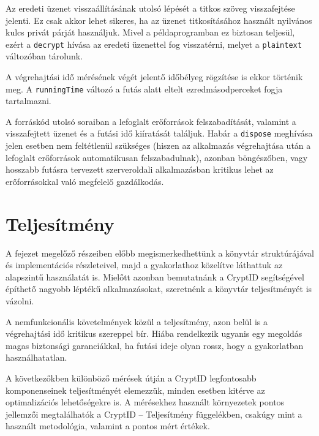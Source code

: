 Az eredeti üzenet visszaállításának utolsó lépését a titkos szöveg visszafejtése jelenti. Ez csak akkor lehet sikeres, ha az üzenet titkosításához használt nyilvános kulcs privát párját használjuk. Mivel a példaprogramban ez biztosan teljesül, ezért a \texttt{decrypt} hívása az eredeti üzenettel fog visszatérni, melyet a \texttt{plaintext} változóban tárolunk.

A végrehajtási idő mérésének végét jelentő időbélyeg rögzítése is ekkor történik meg. A \texttt{runningTime} változó a futás alatt eltelt ezredmásodperceket fogja tartalmazni.



A forráskód utolsó soraiban a lefoglalt erőforrások felszabadítását, valamint a visszafejtett üzenet és a futási idő kiíratását találjuk. Habár a \texttt{dispose} meghívása jelen esetben nem feltétlenül szükséges (hiszen az alkalmazás végrehajtása után a lefoglalt erőforrások automatikusan felszabadulnak), azonban böngészőben, vagy hosszabb futásra tervezett szerveroldali alkalmazásban kritikus lehet az erőforrásokkal való megfelelő gazdálkodás.

\section{Teljesítmény}
\label{Section::Performance}

A fejezet megelőző részeiben előbb megismerkedhettünk a könyvtár struktúrájával és implementációs részleteivel, majd a gyakorlathoz közelítve láthattuk az alapszintű használatát is. Mielőtt azonban bemutatnánk a CryptID segítségével építhető nagyobb léptékű alkalmazásokat, szeretnénk a könyvtár teljesítményét is vázolni.

A nemfunkcionális követelmények közül a teljesítmény, azon belül is a végrehajtási idő kritikus szereppel bír. Hiába rendelkezik ugyanis egy megoldás magas biztonsági garanciákkal, ha futási ideje olyan rossz, hogy a gyakorlatban használhatatlan. 

A következőkben különböző mérések útján a CryptID legfontosabb komponenseinek teljesítményét elemezzük, minden esetben kitérve az optimalizációs lehetőségekre is. A mérésekhez használt környezetek pontos jellemzői megtalálhatók a CryptID – Teljesítmény függelékben, csakúgy mint a használt metodológia, valamint a pontos mért értékek.


